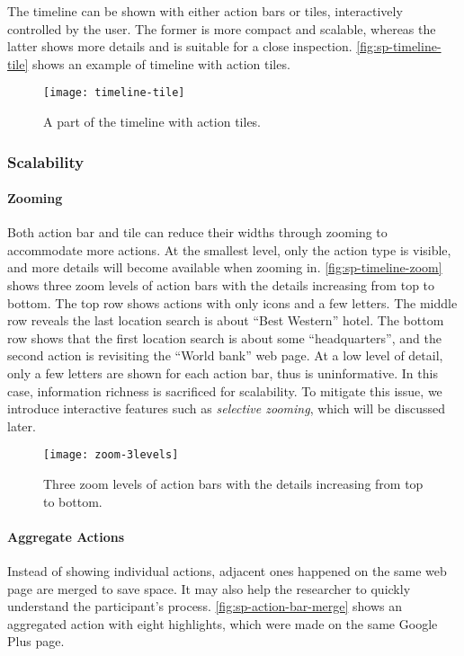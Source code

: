 The timeline can be shown with either action bars or tiles, interactively controlled by the user. The former is more compact and scalable, whereas the latter shows more details and is suitable for a close inspection. \autoref{fig:sp-timeline-tile} shows an example of timeline with action tiles.

\begin{figure}[!htb]
\centering
\texttt{[image: timeline-tile]}
\caption{A part of the timeline with action tiles.}
\label{fig:sp-timeline-tile}
\end{figure}

\subsubsection{Scalability}
\paragraph{Zooming}
Both action bar and tile can reduce their widths through zooming to accommodate more actions. At the smallest level, only the action type is visible, and more details will become available when zooming in. \autoref{fig:sp-timeline-zoom} shows three zoom levels of action bars with the details increasing from top to bottom. The top row shows actions with only icons and a few letters. The middle row reveals the last location search is about ``Best Western'' hotel. The bottom row shows that the first location search is about some ``headquarters'', and the second action is revisiting the ``World bank'' web page. At a low level of detail, only a few letters are shown for each action bar, thus is uninformative. In this case, information richness is sacrificed for scalability. To mitigate this issue, we introduce interactive features such as \emph{selective zooming}, which will be discussed later.

\begin{figure}[!htb]
\centering
\texttt{[image: zoom-3levels]}
\caption{Three zoom levels of action bars with the details increasing from top to bottom.}
\label{fig:sp-timeline-zoom}
\end{figure}

\paragraph{Aggregate Actions}
Instead of showing individual actions, adjacent ones happened on the same web page are merged to save space. It may also help the researcher to quickly understand the participant's process. \autoref{fig:sp-action-bar-merge} shows an aggregated action with eight highlights, which were made on the same Google Plus page.

